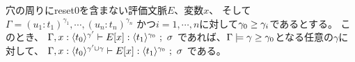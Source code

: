 \begin{lemm}[識別子に関する多相性]
  穴の周りにreset0を含まない評価文脈$E$、変数$x$、
  そして$\Gamma = (u_1:t_1)^{\gamma_1}, \cdots, (u_n:t_n)^{\gamma_n}$
      かつ$i=1,\cdots,n$に対して$\gamma_0 \ge \gamma_i$であるとする。
  このとき、
  $\Gamma, x:\langle{t_0}\rangle^{\gamma'} \vdash E[x] : \langle{t_1}\rangle^{\gamma_0} ~;~\sigma$
  であれば、$\Gamma \models \gamma \ge \gamma_0$となる任意の$\gamma$に対して、
  $\Gamma, x:\langle{t_0}\rangle^{\gamma'\cup \gamma} \vdash 
   E[x] : \langle{t_1}\rangle^{\gamma_0} ~;~\sigma$
  である。 
\end{lemm}

%

